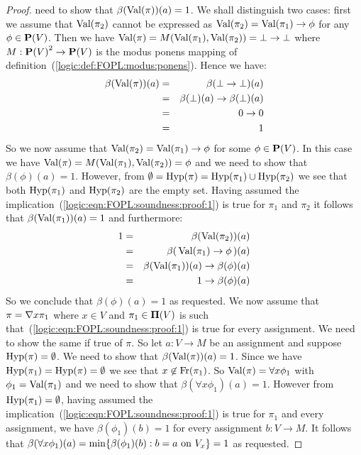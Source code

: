 \begin{proof}
need to show that $\beta(\mbox{\rm Val}(\pi))(a)=1$. We shall distinguish two
cases: first we assume that $\mbox{\rm Val}(\pi_{2})$ cannot be expressed as
$\mbox{\rm Val}(\pi_{2})=\mbox{\rm Val}(\pi_{1})\to\phi$ for any $\phi\in\mbox{${\bf P}(V)$}$. Then we
have $\mbox{\rm Val}(\pi)=M(\mbox{\rm Val}(\pi_{1}),\mbox{\rm Val}(\pi_{2}))=\bot\to\bot$ where
$M:\mbox{${\bf P}(V)$}^{2}\rightarrow \mbox{${\bf P}(V)$}$ is the modus ponens mapping of
definition~(\ref{logic:def:FOPL:modus:ponens}). Hence we have:
    \begin{eqnarray*}
    \beta(\mbox{\rm Val}(\pi))(a)&=&\beta(\bot\to\bot)(a)\\
    &=&\beta(\bot)(a)\to\beta(\bot)(a)\\
    &=&0\to 0\\
    &=&1
    \end{eqnarray*}
So we now assume that $\mbox{\rm Val}(\pi_{2})=\mbox{\rm Val}(\pi_{1})\to\phi$ for some
$\phi\in\mbox{${\bf P}(V)$}$. In this case we have
$\mbox{\rm Val}(\pi)=M(\mbox{\rm Val}(\pi_{1}),\mbox{\rm Val}(\pi_{2}))=\phi$ and we need to show
that $\beta(\phi)(a)=1$. However, from
$\emptyset=\mbox{\rm Hyp}(\pi)=\mbox{\rm Hyp}(\pi_{1})\cup\mbox{\rm Hyp}(\pi_{2})$ we see that
both $\mbox{\rm Hyp}(\pi_{1})$ and $\mbox{\rm Hyp}(\pi_{2})$ are the empty set. Having
assumed the implication~(\ref{logic:eqn:FOPL:soundness:proof:1}) is
true for $\pi_{1}$ and $\pi_{2}$ it follows that
$\beta(\mbox{\rm Val}(\pi_{1}))(a)=1$ and furthermore:
    \begin{eqnarray*}
    1&=&\beta(\mbox{\rm Val}(\pi_{2}))(a)\\
    &=&\beta(\,\mbox{\rm Val}(\pi_{1})\to\phi\,)(a)\\
    &=&\beta(\mbox{\rm Val}(\pi_{1}))(a)\to\beta(\phi)(a)\\
    &=&1\to\beta(\phi)(a)\\
    \end{eqnarray*}
So we conclude that $\beta(\phi)(a)=1$ as requested. We now assume
that $\pi=\mbox{$\nabla$} x\pi_{1}$ where $x\in V$ and $\pi_{1}\in\mbox{${\bf\Pi}(V)$}$ is such
that~(\ref{logic:eqn:FOPL:soundness:proof:1}) is true for every
assignment. We need to show the same if true of $\pi$. So let
$a:V\to M$ be an assignment and suppose $\mbox{\rm Hyp}(\pi)=\emptyset$. We
need to show that $\beta(\mbox{\rm Val}(\pi))(a)=1$. Since we have
$\mbox{\rm Hyp}(\pi_{1})=\mbox{\rm Hyp}(\pi)=\emptyset$ we see that
$x\not\in\mbox{\rm Fr}(\pi_{1})$. So $\mbox{\rm Val}(\pi)=\forall x\phi_{1}$ with
$\phi_{1}=\mbox{\rm Val}(\pi_{1})$ and we need to show that $\beta(\forall
x\phi_{1})(a)=1$. However from $\mbox{\rm Hyp}(\pi_{1})=\emptyset$, having
assumed the implication~(\ref{logic:eqn:FOPL:soundness:proof:1}) is
true for $\pi_{1}$ and every assignment, we have
$\beta(\phi_{1})(b)=1$ for every assignment $b:V\to M$. It follows
that $\beta(\forall
x\phi_{1})(a)=\min\{\beta(\phi_{1})(b):b=a\mbox{\ on\
    }V_{x}\}=1$ as requested.
\end{proof}
